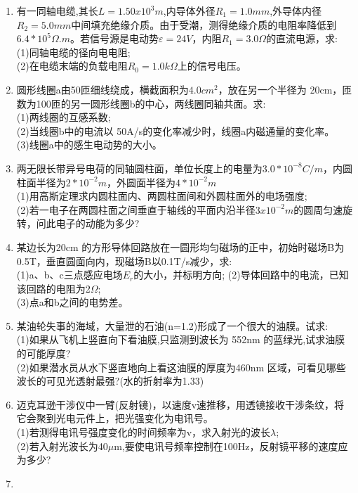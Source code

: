 
\begin{enumerate}
\item 有一同轴电缆,其长$L=1.50x10^3m$,内导体外径$R_1=1.0mm$,外导体内径$R_2=5.0mm$中间填充绝缘介质。由于受潮，测得绝缘介质的电阻率降低到$6.4*10^5\Omega .m$。若信号源是电动势$\varepsilon=24V$，内阻$R_1=3.0\Omega$的直流电源，求:\\
(1)同轴电缆的径向电电阻;\\
(2)在电缆末端的负载电阻$R_0=1.0k \Omega$上的信号电压。
\item 圆形线圈a由50匝细线绕成，横截面积为$4.0cm^2$，放在另一个半径为 20cm，匝数为100匝的另一圆形线圈b的中心，两线圈同轴共面。求:\\
(1)两线圈的互感系数;\\
(2)当线圈b中的电流以 50A/s的变化率减少时，线圈a内磁通量的变化率。\\
(3)线圈a中的感生电动势的大小。
\item 两无限长带异号电荷的同轴圆柱面，单位长度上的电量为$3.0*10^{-8}C/m$，内圆柱面半径为$2*10^{-2}m$，外圆面半径为$4*10^{-2}m$\\
(1)用高斯定理求内圆柱面内、两圆柱面间和外圆柱面外的电场强度;\\
(2)若一电子在两圆柱面之间垂直于轴线的平面内沿半径$3x10^{-2}m$的圆周匀速旋转，问此电子的动能为多少?
\item 某边长为20cm 的方形导体回路放在一圆形均匀磁场的正中，初始时磁场B为 0.5T，垂直圆面向内，现磁场B以0.1T/s减少，求:\\
(1)a、b、c三点感应电场$E_r$的大小，并标明方向;
(2)导体回路中的电流，已知该回路的电阻为2$\Omega$;\\
(3)点a和b之间的电势差。
\item 某油轮失事的海域，大量泄的石油(n=1.2)形成了一个很大的油膜。试求:\\
(1)如果从飞机上竖直向下看油膜,只监测到波长为 552nm 的蓝绿光,试求油膜的可能厚度?\\
(2)如果潜水员从水下竖直地向上看这油膜的厚度为460nm 区域，可看见哪些波长的可见光透射最强?(水的折射率为1.33)
\item 迈克耳逊干涉仪中一臂(反射镜)，以速度v速推移，用透镜接收干涉条纹，将它会聚到光电元件上，把光强变化为电讯号。\\
(1)若测得电讯号强度变化的时间频率为v，求入射光的波长$\lambda$;\\
(2)若入射光波长为40$\mu$m,要使电讯号频率控制在100Hz，反射镜平移的速度应为多少?
\item 
\end{enumerate}